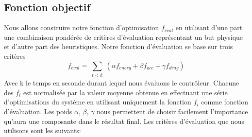 \documentclass[runningheads,a4paper]{llncs}
\begin{document}
\subsection{Fonction objectif}
%
Nous allons construire notre fonction d'optimisation $f_{eval}$ en utilisant d'une part une combinaison pondérée de critères d'évaluation représentant un but physique et d'autre part des heuristiques. Notre fonction d'évaluation se base sur trois critères 
\begin{equation}
f_{eval}=\sum_{\substack{t<k}} (\alpha f_{energ} + \beta f_{acc} + \gamma f_{drag})
\label{eq:simple_objective}
\end{equation}
Avec k le temps en seconde durant lequel nous évaluons le contrôleur.
Chacune des $f_i$ est normalisée par la valeur moyenne obtenue en effectuant une série d'optimisations du système en utilisant uniquement la fonction $f_i$ comme fonction d'évaluation. Les poids $\alpha$, $\beta$, $\gamma$ nous permettent de choisir facilement l'importance qu'aura une composante dans le résultat final. Les critères d'évaluation que nous utilisons sont les suivants:
\end{document}
